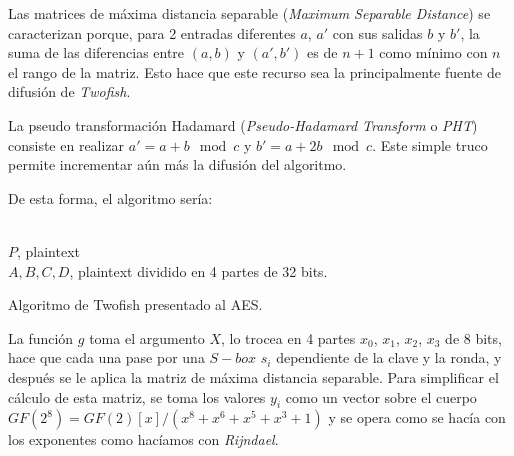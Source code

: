 Las matrices de máxima distancia separable (\textit{Maximum Separable Distance}) se caracterizan porque, para 2 entradas diferentes $a$, $a'$ con sus salidas $b$ y $b'$, la suma de las diferencias entre $(a, b)$ y $(a', b')$ es de $n+1$ como mínimo con $n$ el rango de la matriz. Esto hace que este recurso sea la principalmente fuente de difusión de \textit{Twofish}.

La pseudo transformación Hadamard (\textit{Pseudo-Hadamard Transform} o \textit{PHT}) consiste en realizar $a' = a + b \mod c$ y $b' = a + 2b \mod c$. Este simple truco permite incrementar aún más la difusión del algoritmo. \cite{TwoFish_AES}

De esta forma, el algoritmo sería:

\begin{algorithm}[H]
	\begin{algorithmic}[1]
		\REQUIRE \ \\
			\texttt{$P$}, plaintext\\
			\texttt{$A, B, C, D$}, plaintext dividido en 4 partes de 32 bits.\\
	

	\ENDFOR	

	\end{algorithmic}
	\caption{Algoritmo de Twofish presentado al AES.}
		\label{alg:Twofish}
\end{algorithm}

La función $g$ toma el argumento $X$, lo trocea en 4 partes $x_0$, $x_1$, $x_2$, $x_3$ de 8 bits, hace que cada una pase por una $S-box$ $s_i$ dependiente de la clave y la ronda, y después se le aplica la matriz de máxima distancia separable. Para simplificar el cálculo de esta matriz, se toma los valores $y_i$ como un vector sobre el cuerpo $\textit{GF}(2^8) = \textit{GF}(2)[x]/(x^8+x^6+x^5+x^3+1)$ y se opera como se hacía con los exponentes como hacíamos con \textit{Rijndael}.

